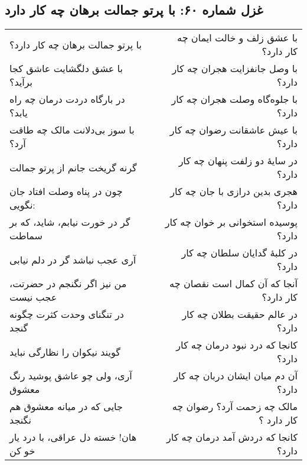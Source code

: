 \begin{center}
\section*{غزل شماره ۶۰: با پرتو جمالت برهان چه کار دارد}
\label{sec:060}
\begin{longtable}{l p{0.5cm} r}
با پرتو جمالت برهان چه کار دارد؟
&&
با عشق زلف و خالت ایمان چه کار دارد؟
\\
با عشق دلگشایت عاشق کجا برآید؟
&&
با وصل جانفزایت هجران چه کار دارد؟
\\
در بارگاه دردت درمان چه راه یابد؟
&&
با جلوه‌گاه وصلت هجران چه کار دارد؟
\\
با سوز بی‌دلانت مالک چه طاقت آرد؟
&&
با عیش عاشقانت رضوان چه کار دارد؟
\\
گرنه گریخت جانم از پرتو جمالت
&&
در سایهٔ دو زلفت پنهان چه کار دارد؟
\\
چون در پناه وصلت افتاد جان نگویی:
&&
هجری بدین درازی با جان چه کار دارد؟
\\
گر در خورت نیابم، شاید، که بر سماطت
&&
پوسیده استخوانی بر خوان چه کار دارد؟
\\
آری عجب نباشد گر در دلم نیابی
&&
در کلبهٔ گدایان سلطان چه کار دارد؟
\\
من نیز اگر نگنجم در حضرتت، عجب نیست
&&
آنجا که آن کمال است نقصان چه کار دارد؟
\\
در تنگنای وحدت کثرت چگونه گنجد
&&
در عالم حقیقت بطلان چه کار دارد؟
\\
گویند نیکوان را نظارگی نباید
&&
کانجا که درد نبود درمان چه کار دارد؟
\\
آری، ولی چو عاشق پوشید رنگ معشوق
&&
آن دم میان ایشان دربان چه کار دارد؟
\\
جایی که در میانه معشوق هم نگنجد
&&
مالک چه زحمت آرد؟ رضوان چه کار دارد ؟
\\
هان! خسته دل عراقی، با درد یار خو کن
&&
کانجا که دردش آمد درمان چه کار دارد؟
\\
\end{longtable}
\end{center}
